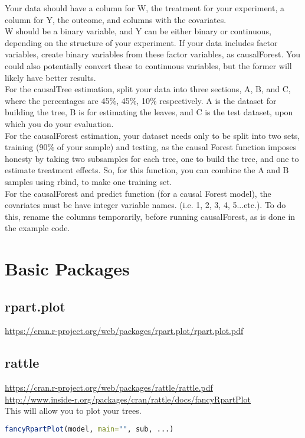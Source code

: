 \documentclass{article}
\begin{document}
Your data should have a column for W, the treatment for your experiment, a column for Y, the outcome, and columns with the covariates. \\
W should be a binary variable, and Y can be either binary or continuous, depending on the structure of your experiment.
If your data includes factor variables, create binary variables from these factor variables, as causalForest. You could also potentially convert these to continuous variables, but the former will likely have better results.\\

For the causalTree estimation, split your data into three sections, A, B, and C, where the percentages are 45\%, 45\%, 10\% respectively. A is the dataset for building the tree, B is for estimating the leaves, and C is the test dataset, upon which you do your evaluation. \\

For the causalForest estimation, your dataset needs only to be split into two sets, training (90\% of your sample) and testing, as the causal Forest function imposes honesty by taking two subsamples for each tree, one to build the tree, and one to estimate treatment effects. So, for this function, you can combine the A and B samples using rbind, to make one training set.  \\

For the causalForest and predict function (for a causal Forest model), the covariates must be have integer variable names.  (i.e. 1, 2, 3, 4, 5...etc.). To do this, rename the columns temporarily, before running causalForest, as is done in the example code.  \\

\section{Basic Packages}
\subsection{rpart.plot } \url{https://cran.r-project.org/web/packages/rpart.plot/rpart.plot.pdf}
\subsection{rattle} 
 	\url{https://cran.r-project.org/web/packages/rattle/rattle.pdf} \\
 	\url{http://www.inside-r.org/packages/cran/rattle/docs/fancyRpartPlot} \\
	This will allow you to plot your trees. 
\begin{lstlisting}[language=R]
fancyRpartPlot(model, main="", sub, ...)
\end{lstlisting}
\end{document}
